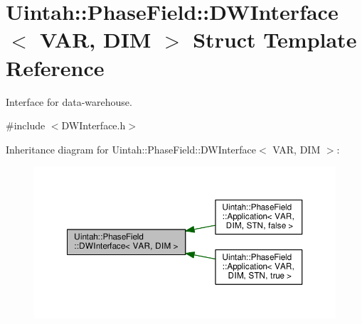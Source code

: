 \hypertarget{structUintah_1_1PhaseField_1_1DWInterface}{}\section{Uintah\+:\+:Phase\+Field\+:\+:D\+W\+Interface$<$ V\+AR, D\+IM $>$ Struct Template Reference}
\label{structUintah_1_1PhaseField_1_1DWInterface}


Interface for data-\/warehouse.  




{\ttfamily \#include $<$D\+W\+Interface.\+h$>$}



Inheritance diagram for Uintah\+:\+:Phase\+Field\+:\+:D\+W\+Interface$<$ V\+AR, D\+IM $>$\+:\nopagebreak
\begin{figure}[H]
\begin{center}
\leavevmode
\includegraphics[width=350pt]{structUintah_1_1PhaseField_1_1DWInterface__inherit__graph}
\end{center}
\end{figure}
